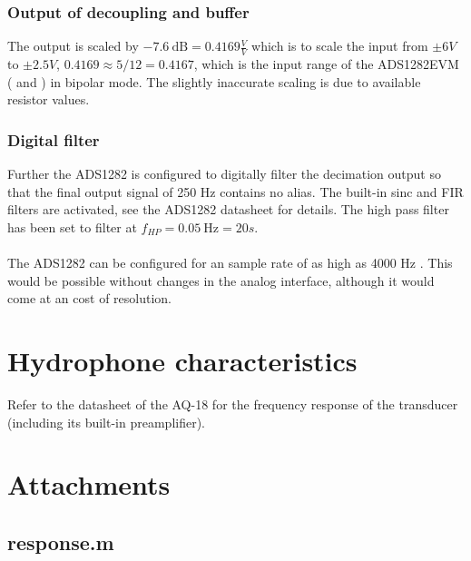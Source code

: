 \documentclass[a4paper]{article}
\begin{document}
\subsubsection{Output of decoupling and buffer} The output is scaled by $-7.6\ \text{dB} =
0.4169 \frac{V}{V}$ which is to scale the input from $\pm 6V$ to $\pm 2.5V$, $0.4169
\approx 5 / 12 = 0.4167$, which is the input range of the ADS1282EVM
(\cite{ads1282evm_ds} and \cite{ads1282_ds}) in bipolar mode. The
slightly inaccurate scaling is due to available resistor values.

\subsubsection{Digital filter}
Further the ADS1282 is configured to digitally filter the decimation
output so that the final output signal of 250 Hz contains no alias. The
built-in sinc and FIR filters are activated, see the ADS1282 datasheet
\cite{ads1282_ds} for details. The high pass filter has been
set to filter at $f_{HP} = 0.05\ \text{Hz} = 20s$.

\paragraph{}The
ADS1282 can be configured for an sample rate of as high as 4000 Hz
\cite{ads1282_ds}. This would be possible without changes in the analog interface, although it would come at an cost of resolution.

\section{Hydrophone characteristics}
Refer to the datasheet of the AQ-18 \cite{aq_18_ds} for the frequency response of the
transducer (including its built-in preamplifier).

\newpage
\printbibliography

\newpage
\section{Attachments}
\subsection{response.m}

\end{document}
